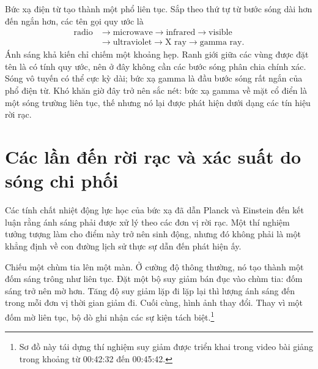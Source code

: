 Bức xạ điện từ tạo thành một phổ liên tục. Sắp theo thứ tự từ bước sóng dài hơn đến ngắn hơn, các tên gọi quy ước là
\begin{equation}
\begin{aligned}
\text{radio}
&\longrightarrow \text{microwave}
\longrightarrow \text{infrared}
\longrightarrow \text{visible}\\
&\longrightarrow \text{ultraviolet}
\longrightarrow \text{X ray}
\longrightarrow \text{gamma ray}.
\end{aligned}
\end{equation}
Ánh sáng khả kiến chỉ chiếm một khoảng hẹp. Ranh giới giữa các vùng được đặt tên là có tính quy ước, nên ở đây không cần các bước sóng phân chia chính xác. Sóng vô tuyến có thể cực kỳ dài; bức xạ gamma là đầu bước sóng rất ngắn của phổ điện từ. Khó khăn giờ đây trở nên sắc nét: bức xạ gamma về mặt cổ điển là một sóng trường liên tục, thế nhưng nó lại được phát hiện dưới dạng các tín hiệu rời rạc.

\section{Các lần đến rời rạc và xác suất do sóng chi phối}

Các tính chất nhiệt động lực học của bức xạ đã dẫn Planck và Einstein đến kết luận rằng ánh sáng phải được xử lý theo các đơn vị rời rạc. Một thí nghiệm tưởng tượng làm cho điểm này trở nên sinh động, nhưng đó không phải là một khẳng định về con đường lịch sử thực sự dẫn đến phát hiện ấy.

Chiếu một chùm tia lên một màn. Ở cường độ thông thường, nó tạo thành một đốm sáng trông như liên tục. Đặt một bộ suy giảm bán đục vào chùm tia: đốm sáng trở nên mờ hơn. Tăng độ suy giảm lặp đi lặp lại thì lượng ánh sáng đến trong mỗi đơn vị thời gian giảm đi. Cuối cùng, hình ảnh thay đổi. Thay vì một đốm mờ liên tục, bộ dò ghi nhận các sự kiện tách biệt.\footnote{Sơ đồ này tái dựng thí nghiệm suy giảm được triển khai trong video bài giảng trong khoảng từ 00:42:32 đến 00:45:42.}

